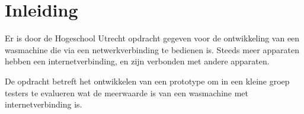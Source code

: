\chapter{Inleiding}

Er is door de Hogeschool Utrecht opdracht gegeven voor de ontwikkeling van een wasmachine die via een netwerkverbinding te bedienen is. Steeds meer apparaten hebben een internetverbinding, en zijn verbonden met andere apparaten. \cite{wonenTussen100Sensoren}

De opdracht betreft het ontwikkelen van een prototype om in een kleine groep testers te evalueren wat de meerwaarde is van een wasmachine met internetverbinding is. 